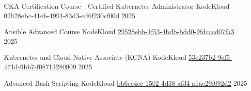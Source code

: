
\begin{cvhonors}

  \cvhonor
    {CKA Certification Course - Certified Kubernetes Administrator} %
    {KodeKloud} %
    {\href{https://learn.kodekloud.com/certificate/02b28ebc-41eb-4991-83d3-cd6f230cf00d}{02b28ebc-41eb-4991-83d3-cd6f230cf00d}} %
    {2025} %

  \cvhonor
    {Ansible Advanced Course} %
    {KodeKloud} %
    {\href{https://learn.kodekloud.com/certificate/29528ebb-1f53-4bdb-bdd0-9fdcccd07fa3}{29528ebb-1f53-4bdb-bdd0-9fdcccd07fa3}} %
    {2025} %

  \cvhonor
    {Kubernetes and Cloud-Native Associate (KCNA)} %
    {KodeKloud} %
    {\href{https://learn.kodekloud.com/certificate/53c237b2-9cf5-471d-9bb7-f08713280909}{53c237b2-9cf5-471d-9bb7-f08713280909}} %
    {2025} %

  \cvhonor
    {Advanced Bash Scripting} %
    {KodeKloud} %
    {\href{https://learn.kodekloud.com/certificate/bb6cc4cc-1502-4d38-af34-a1ae29f092d2}{bb6cc4cc-1502-4d38-af34-a1ae29f092d2}} %
    {2025} %

\end{cvhonors}
